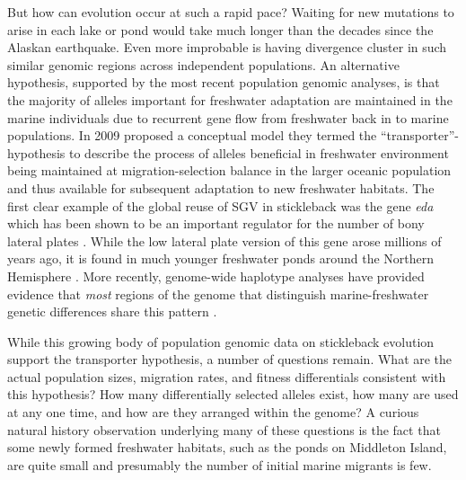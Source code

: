 \documentclass{article}
\begin{document}
But how can evolution occur at such a rapid pace?
Waiting for new mutations to arise in each lake or pond would take much longer than the decades since the Alaskan earthquake. 
Even more improbable is having divergence cluster in such similar genomic regions across independent populations. 
An alternative hypothesis, supported by the most recent population genomic analyses, is that the majority of alleles important for freshwater adaptation are maintained in the marine individuals due to recurrent gene flow from freshwater back in to marine populations. 
In 2009 \citet{schluter2009genetics} proposed a conceptual model they termed the ``transporter''- hypothesis to describe the process of alleles beneficial in freshwater environment being maintained at migration-selection balance in the larger oceanic population and thus available for subsequent adaptation to new freshwater habitats.
The first clear example of the global reuse of SGV in stickleback was the gene \textit{eda} which has been shown to be an important regulator for the number of bony lateral plates 
\citep{Colosimo_2004, Cresko_2004, Colosimo_2005}. 
While the low lateral plate version of this gene arose millions of years ago, it is found in much younger freshwater ponds around the Northern Hemisphere 
\citep{O'Brian_2015}. 
More recently, genome-wide haplotype analyses have provided evidence that \textit{most} regions of the genome that distinguish marine-freshwater genetic differences share this pattern \citep{nelson2017ancient}. 

While this growing body of population genomic data on stickleback evolution support the transporter hypothesis, a number of questions remain. 
What are the actual population sizes, migration rates, and fitness differentials consistent with this hypothesis? 
How many differentially selected alleles exist, how many are used at any one time, and how are they arranged within the genome? 
A curious natural history observation underlying many of these questions is the fact that some newly formed freshwater habitats, such as the ponds on Middleton Island, are quite small and presumably the number of initial marine migrants is few. 
\end{document}

